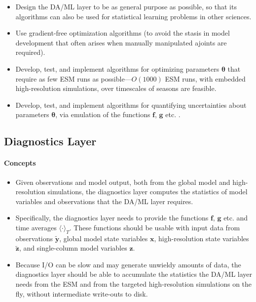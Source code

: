 \documentclass{article}
\renewcommand{\vec}[1]{\boldsymbol{{#1}}}
\begin{document}
\begin{itemize}
    \item Design the DA/ML layer to be as general purpose as possible, so that its algorithms can also be used for statistical learning problems in other sciences.
    \item Use gradient-free optimization algorithms (to avoid the stasis in model development that often arises when manually manipulated ajoints are required).
    \item Develop, test, and implement algorithms for optimizing parameters $\vec{\theta}$ that require as few ESM runs as possible---$O(1000)$ ESM runs, with embedded high-resolution simulations, over timescales of seasons are feasible. 
    \item Develop, test, and implement algorithms for quantifying uncertainties about parameters $\vec{\theta}$, via emulation of the functions $\vec{f}$, $\vec{g}$ etc. \citep{Kennedy01a,OHagan06a}.
\end{itemize}

\subsection{Diagnostics Layer}

\paragraph{Concepts}

\begin{itemize}
    \item  Given observations and model output, both from the global model and high-resolution simulations, the diagnostics layer computes the statistics of model variables and observations that the DA/ML layer requires.
    \item Specifically, the diagnostics layer needs to provide the functions $\vec{f}$, $\vec{g}$ etc. and time averages $\langle \cdot \rangle_T$. These functions should be usable with input data from observations $\vec{\tilde y}$, global model state variables $\vec{x}$, high-resolution state variables $\vec{\tilde z}$, and single-column model variables $\vec{z}$.
    \item Because I/O can be slow and may generate unwieldy amounts of data, the diagnostics layer should be able to accumulate the statistics the DA/ML layer needs from the ESM and from the targeted high-resolution simulations on the fly, without intermediate write-outs to disk.
\end{itemize}
\end{document}
